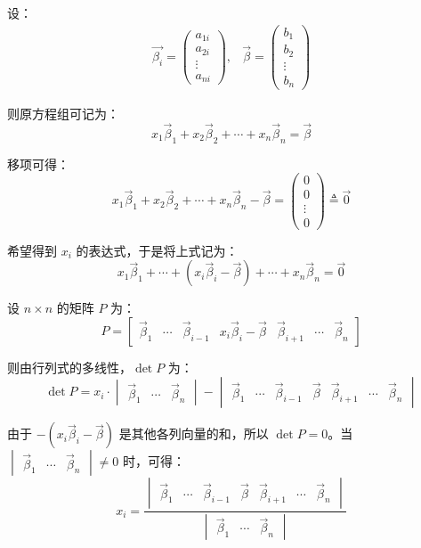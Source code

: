 设：
$$
\begin{matrix}
	\vec{\beta_i} = \begin{pmatrix} a_{1i} \\ a_{2i} \\ \vdots \\ a_{ni} \end{pmatrix},
	&
	\vec{\beta} = \begin{pmatrix} b_1 \\ b_2 \\ \vdots \\ b_n \end{pmatrix}
\end{matrix}
$$

则原方程组可记为：
$$
x_1 \vec \beta_1 + x_2 \vec \beta_2 + \cdots + x_n \vec \beta_n = \vec \beta
$$

移项可得：
$$
x_1 \vec \beta_1 + x_2 \vec \beta_2 + \cdots + x_n \vec \beta_n - \vec \beta =
\begin{pmatrix} 0 \\ 0 \\ \vdots \\ 0 \end{pmatrix}
\triangleq \vec 0
$$

希望得到 $x_i$ 的表达式，于是将上式记为：
$$
x_1 \vec \beta_1 + \cdots + (x_i \vec \beta_i - \vec \beta) + \cdots + x_n \vec \beta_n = \vec 0
$$

设 $n \times n$ 的矩阵 $P$ 为：
$$
P =
\begin{bmatrix} \vec \beta_1 & \cdots & \vec \beta_{i - 1} & x_i \vec \beta_i - \vec \beta & \vec \beta_{i + 1} & \cdots & \vec \beta_n \end{bmatrix}
$$

则由行列式的多线性，$\det P$ 为：
$$
\det P = x_i \cdot
\begin{vmatrix} \vec \beta_1 & \cdots & \vec \beta_n \end{vmatrix}
-
\begin{vmatrix} \vec \beta_1 & \cdots & \vec \beta_{i - 1} & \vec \beta & \vec \beta_{i + 1} & \cdots & \vec \beta_n \end{vmatrix}
$$

由于 $-(x_i \vec \beta_i - \vec \beta)$ 是其他各列向量的和，所以 $\det P = 0$。当 $\begin{vmatrix} \vec \beta_1 & \cdots & \vec \beta_n \end{vmatrix} \ne 0$ 时，可得：
$$
x_i = \dfrac{\begin{vmatrix} \vec \beta_1 & \cdots & \vec \beta_{i - 1} &\vec \beta & \vec \beta_{i + 1} & \cdots & \vec \beta_n \end{vmatrix}}{\begin{vmatrix} \vec \beta_1 & \cdots & \vec \beta_n \end{vmatrix}}
$$

